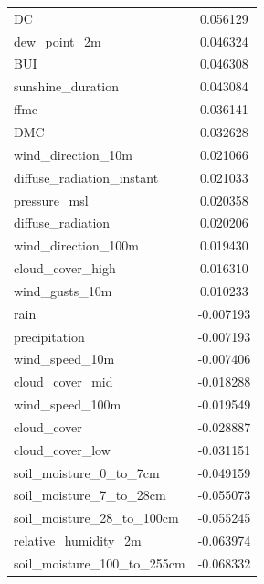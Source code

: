 \begin{table}[H]
\begin{tabular}{lc}
		DC                                        & 0.056129    \\ 
		dew\_point\_2m                            & 0.046324    \\ 
		BUI                                       & 0.046308    \\ 
		sunshine\_duration                        & 0.043084    \\ 
		ffmc                                      & 0.036141    \\ 
		DMC                                       & 0.032628    \\ 
		wind\_direction\_10m                      & 0.021066    \\ 
		diffuse\_radiation\_instant               & 0.021033    \\ 
		pressure\_msl                             & 0.020358    \\ 
		diffuse\_radiation                        & 0.020206    \\ 
		wind\_direction\_100m                     & 0.019430    \\ 
		cloud\_cover\_high                        & 0.016310    \\ 
		wind\_gusts\_10m                          & 0.010233    \\ 
		rain                                      & -0.007193   \\ 
		precipitation                             & -0.007193   \\ 
		wind\_speed\_10m                          & -0.007406   \\ 
		cloud\_cover\_mid                         & -0.018288   \\ 
		wind\_speed\_100m                         & -0.019549   \\ 
		cloud\_cover                              & -0.028887   \\ 
		cloud\_cover\_low                         & -0.031151   \\ 
		soil\_moisture\_0\_to\_7cm                & -0.049159   \\ 
		soil\_moisture\_7\_to\_28cm               & -0.055073   \\ 
		soil\_moisture\_28\_to\_100cm             & -0.055245   \\ 
		relative\_humidity\_2m                    & -0.063974   \\ 
		soil\_moisture\_100\_to\_255cm            & -0.068332   \\
	\end{tabular}
\end{table}

